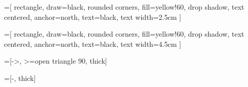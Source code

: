 =[
  rectangle,
  draw=black,
  rounded corners,
  fill=yellow!60,
  drop shadow,
  text centered,
  anchor=north,
  text=black,
  text width=2.5cm
]

=[
  rectangle,
  draw=black,
  rounded corners,
  fill=yellow!60,
  drop shadow,
  text centered,
  anchor=north,
  text=black,
  text width=4.5cm
]

=[->, >=open triangle 90, thick]

=[-, thick]
